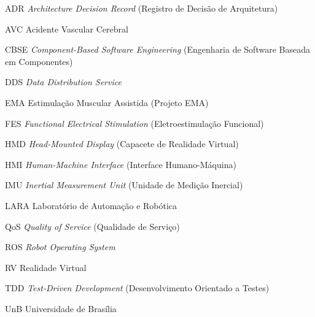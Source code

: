\begin{siglas}
  \item[ADR] \emph{Architecture Decision Record} (Registro de Decisão de Arquitetura)
  \item[AVC] Acidente Vascular Cerebral
  \item[CBSE] \emph{Component-Based Software Engineering} (Engenharia de Software Baseada em Componentes)
  \item[DDS] \emph{Data Distribution Service}
  \item[EMA] Estimulação Muscular Assistida (Projeto EMA)
  \item[FES] \emph{Functional Electrical Stimulation} (Eletroestimulação Funcional)
  \item[HMD] \emph{Head-Mounted Display} (Capacete de Realidade Virtual)
  \item[HMI] \emph{Human-Machine Interface} (Interface Humano-Máquina)
  \item[IMU] \emph{Inertial Measurement Unit} (Unidade de Medição Inercial)
  \item[LARA] Laboratório de Automação e Robótica
  \item[QoS] \emph{Quality of Service} (Qualidade de Serviço)
  \item[ROS] \emph{Robot Operating System}
  \item[RV] Realidade Virtual
  \item[TDD] \emph{Test-Driven Development} (Desenvolvimento Orientado a Testes)
  \item[UnB] Universidade de Brasília
\end{siglas}
